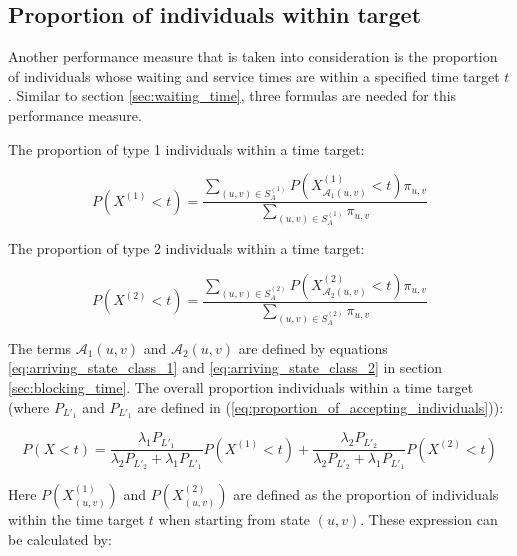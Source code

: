 \subsection{Proportion of individuals within target}\label{sec:proportion_within_target}

Another performance measure that is taken into consideration is the proportion 
of individuals whose waiting and service times are within a specified 
time target \(t\).
Similar to section \ref{sec:waiting_time}, three formulas are needed for this 
performance measure.

The proportion of type 1 individuals within a time target:

\begin{equation}\label{eq:proportion_within_target_type_1}
    P(X^{(1)} < t) = \frac{\sum_{(u,v) \in S_A^{(1)}} 
    P(X_{\mathcal{A}_1(u,v)}^{(1)} < t) 
    \pi_{u,v} }{\sum_{(u,v) \in S_A^{(1)}} \pi_{u,v}}
\end{equation}

The proportion of type 2 individuals within a time target:

\begin{equation}\label{eq:proportion_within_target_type_2}
    P(X^{(2)} < t) = \frac{\sum_{(u,v) \in S_A^{(2)}} 
    P(X_{\mathcal{A}_2(u,v)}^{(2)} < t) 
    \pi_{u,v} }{\sum_{(u,v) \in S_A^{(2)}} \pi_{u,v}}
\end{equation}

The terms \(\mathcal{A}_1(u,v)\) and \(\mathcal{A}_2(u,v)\) are defined by
equations \ref{eq:arriving_state_class_1} and \ref{eq:arriving_state_class_2}
in section \ref{sec:blocking_time}.
The overall proportion individuals within a time target (where \(P_{L'_1}\) and 
\(P_{L'_1}\) are defined in (\ref{eq:proportion_of_accepting_individuals})):

\begin{equation}\label{eq:overall_proportion_within_target}
    P(X < t) = \frac{\lambda_1 P_{L'_1}}{\lambda_2 P_{L'_2}+\lambda_1 P_{L'_1}} 
    P(X^{(1)} < t) + \frac{\lambda_2 P_{L'_2}}{\lambda_2 P_{L'_2} + 
    \lambda_1 P_{L'_1}} P(X^{(2)} < t) 
\end{equation}

Here \(P(X_{(u,v)}^{(1)})\) and \(P(X_{(u,v)}^{(2)})\) are defined as the
proportion of individuals within the time target \(t\) when starting from state 
\((u,v)\).
These expression can be calculated by:

